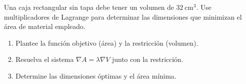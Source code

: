 Una caja rectangular sin tapa debe tener un volumen de $32\ \text{cm}^3$. Use multiplicadores de Lagrange para determinar las dimensiones que minimizan el área de material empleado.
\begin{enumerate}
    \item Plantee la función objetivo (área) y la restricción (volumen).
    \item Resuelva el sistema $\nabla A = \lambda \nabla V$ junto con la restricción.
    \item Determine las dimensiones óptimas y el área mínima.
\end{enumerate}
